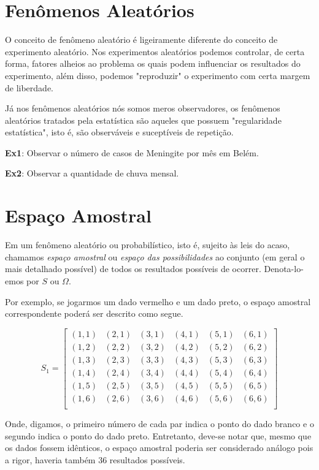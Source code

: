\section{Fenômenos Aleatórios}

O conceito de fenômeno aleatório é ligeiramente diferente do conceito de experimento aleatório. Nos experimentos aleatórios podemos controlar, de certa forma, fatores alheios ao problema os quais podem influenciar os resultados do experimento, além disso, podemos "reproduzir" o experimento com certa margem de liberdade.\vskip0.3cm

Já nos fenômenos aleatórios nós somos meros observadores, os fenômenos aleatórios tratados pela estatística são aqueles que possuem "regularidade estatística", isto é, são observáveis e suceptíveis de repetição.\vskip0.3cm

\textbf{Ex1}: Observar o número de casos de Meningite por mês em
Belém. \vskip0.3cm

\textbf{Ex2}: Observar a quantidade de chuva mensal.\vskip0.3cm


\section{Espaço Amostral}

Em um fenômeno aleatório ou probabilístico, isto é, sujeito às leis do acaso, chamamos \emph{espaço amostral} ou \emph{espaço das possibilidades} ao conjunto (em geral o mais detalhado possível) de todos os resultados possíveis de ocorrer. Denota-lo-emos por $S$ ou $\Omega$.\vskip0.3cm

Por exemplo, se jogarmos um dado vermelho e um dado preto, o espaço amostral correspondente poderá ser descrito como segue.

$$
S_{1} =
\left[%
\begin{array}{cccccc}
  (1,1) & (2,1) & (3,1) & (4,1) & (5,1) & (6,1) \\
  (1,2) & (2,2) & (3,2) & (4,2) & (5,2) & (6,2) \\
  (1,3) & (2,3) & (3,3) & (4,3) & (5,3) & (6,3) \\
  (1,4) & (2,4) & (3,4) & (4,4) & (5,4) & (6,4) \\
  (1,5) & (2,5) & (3,5) & (4,5) & (5,5) & (6,5) \\
  (1,6) & (2,6) & (3,6) & (4,6) & (5,6) & (6,6) \\
\end{array}%
\right]
$$

Onde, digamos, o primeiro número de cada par indica o ponto do
dado branco e o segundo indica o ponto do dado preto. Entretanto, deve-se notar que, mesmo que os dados fossem
idênticos, o espaço amostral poderia ser considerado análogo pois
a rigor, haveria também 36 resultados possíveis.\vskip0.3cm



